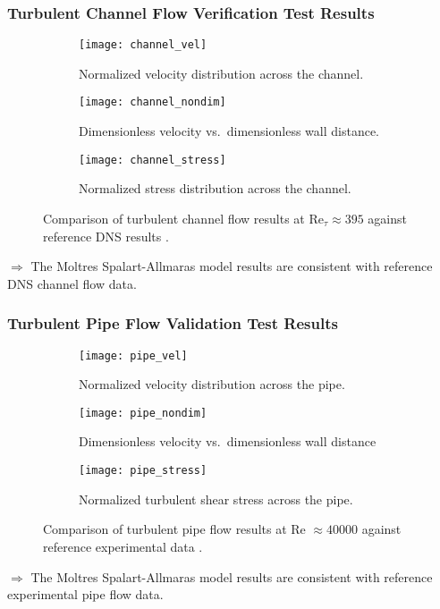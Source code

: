 \begin{frame}
  \frametitle{Turbulent Channel Flow Verification Test Results}
  \begin{figure}[htb!]
    \centering
    \begin{subfigure}[b]{0.32\columnwidth}
      \centering
      \texttt{[image: channel\_vel]}
      \caption{Normalized velocity distribution across the channel.}
      \label{fig:channel-vel}
    \end{subfigure}
    \hfill
    \begin{subfigure}[b]{0.32\columnwidth}
      \centering
      \texttt{[image: channel\_nondim]}
      \caption{Dimensionless velocity vs.\ dimensionless wall distance.}
      \label{fig:channel-nondim}
    \end{subfigure}
    \begin{subfigure}[b]{0.32\columnwidth}
      \centering
      \texttt{[image: channel\_stress]}
      \caption{Normalized stress distribution across the channel.}
      \label{fig:channel-stress}
    \end{subfigure}
    \caption{Comparison of turbulent channel flow results at Re$_\tau\approx395$ against reference
    \gls{DNS} results \cite{moser_direct_1999}.}
    \label{fig:channel-verification}
  \end{figure}
  \vspace{.1cm}

  $\Rightarrow$ The Moltres Spalart-Allmaras model results are consistent with reference DNS channel flow data.
\end{frame}

\begin{frame}
  \frametitle{Turbulent Pipe Flow Validation Test Results}
  \begin{figure}[htb]
    \centering
    \begin{subfigure}[b]{0.32\columnwidth}
      \centering
      \texttt{[image: pipe\_vel]}
      \caption{Normalized velocity distribution across the pipe.}
      \label{fig:pipe-vel}
    \end{subfigure}
    \hfill
    \begin{subfigure}[b]{0.32\columnwidth}
      \centering
      \texttt{[image: pipe\_nondim]}
      \caption{Dimensionless velocity vs.\ dimensionless wall distance}
      \label{fig:pipe-nondim}
    \end{subfigure}
    \begin{subfigure}[b]{0.32\columnwidth}
      \centering
      \texttt{[image: pipe\_stress]}
      \caption{Normalized turbulent shear stress across the pipe.}
      \label{fig:pipe-stress}
    \end{subfigure}
    \caption{Comparison of turbulent pipe flow results at Re $\approx 40000$ against reference
    experimental data \cite{laufer_structure_1954}.}
    \label{fig:pipe-verification}
  \end{figure}
  \vspace{.1cm}

  $\Rightarrow$ The Moltres Spalart-Allmaras model results are consistent with reference experimental pipe flow data.
\end{frame}

